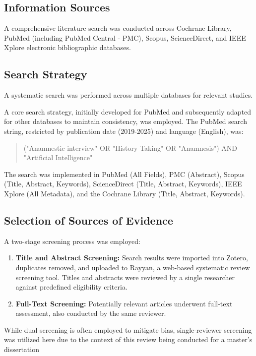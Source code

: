 \subsection{Information Sources} \label{sec:se32}

A comprehensive literature search was conducted across Cochrane Library, PubMed (including PubMed Central - PMC), Scopus, ScienceDirect, and IEEE Xplore electronic bibliographic databases.

\subsection{Search Strategy} \label{sec:se321}

A systematic search was performed across multiple data\-bases for relevant studies. 

A core search strategy, initially developed for PubMed and subsequently adapted for other databases to maintain consistency, was employed. The PubMed search string, restricted by publication date (2019-2025) and language (English), was:

\begin{quote}
("Anamnestic interview" OR "History Taking" OR "Anamnesis") AND "Artificial Intelligence"
\end{quote}

The search was implemented in PubMed (All Fields), PMC (Abstract), Scopus (Title, Abstract, Keywords), ScienceDirect (Title, Abstract, Keywords), IEEE Xplore (All Metadata), and the Cochrane Library (Title, Abstract, Keywords).

\subsection{Selection of Sources of Evidence} \label{sec:se322}

A two-stage screening process was employed:

\begin{enumerate}
    \item \textbf{Title and Abstract Screening:} Search results were imported into Zotero, duplicates removed, and uploaded to Rayyan, a web-based systematic review screening tool. Titles and abstracts were reviewed by a single researcher against predefined eligibility criteria.
    \item \textbf{Full-Text Screening:} Potentially relevant articles underwent full-text assessment, also conducted by the same reviewer.
\end{enumerate}
 While dual screening is often employed to mitigate bias, single-reviewer screening was utilized here due to the context of this review being conducted for a master's dissertation

